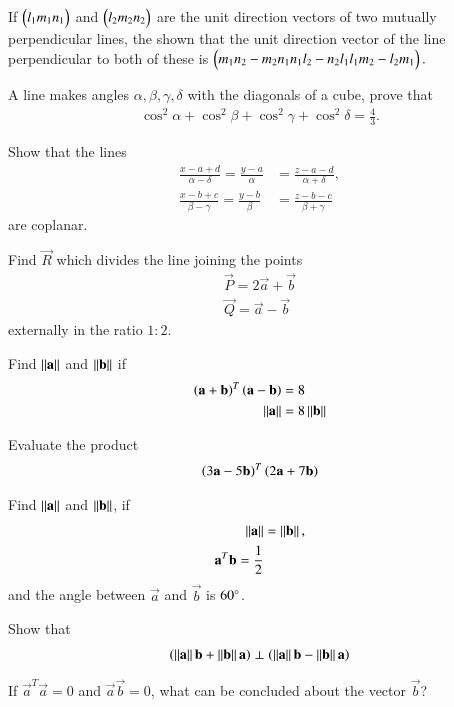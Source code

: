 \item If 
$
\begin{pmatrix}l_1m_1n_1\end{pmatrix}
$
and
$
\begin{pmatrix}l_2m_2n_2\end{pmatrix}
$
are the unit direction vectors of two mutually perpendicular lines, the shown that the unit direction vector of the line perpendicular to both of these is
$
\begin{pmatrix}m_1n_2-m_2n_1n_1l_2-n_2l_1l_1m_2-l_2m_1\end{pmatrix}.
$
\item A line makes angles $\alpha, \beta, \gamma, \delta$ with the diagonals of a cube, prove that \begin{align}
\cos^2\alpha + \cos^2\beta + \cos^2\gamma +\cos^2\delta = \frac{4}{3}.
\end{align}
\item Show that the lines 
\begin{align}
\frac{x-a+d}{\alpha-\delta} = \frac{y-a}{\alpha} &= \frac{z-a-d}{\alpha+\delta}, 
\\
\frac{x-b+c}{\beta-\gamma} = \frac{y-b}{\beta} &= \frac{z-b-c}{\beta+\gamma} 
\end{align}
%
are coplanar.
\item Find $\vec{R}$ which divides the line joining the points 
\begin{align}
\vec{P} = 2\vec{a}+\vec{b}
\\
\vec{Q} = \vec{a}-\vec{b}
\end{align}
externally in the ratio $1:2$.
\item Find $\left\lVert\mathbf{a}\right\rVert$ and $\left\lVert\mathbf{b}\right\rVert$ if 
\begin{align}
\left(\mathbf{a}+\mathbf{b}\right)^T\left(\mathbf{a}-\mathbf{b}\right) &= 8
\\
\left\lVert\mathbf{a}\right\rVert&=8\left\lVert\mathbf{b}\right\rVert
\end{align}
\item Evaluate the product 
\begin{align}
\left(3\mathbf{a}-5\mathbf{b}\right)^T\left(2\mathbf{a}+7\mathbf{b}\right) 
\end{align}
\item Find $\left\lVert\mathbf{a}\right\rVert$ and $\left\lVert\mathbf{b}\right\rVert$, if
\begin{align}
\left\lVert\mathbf{a}\right\rVert &= \left\lVert\mathbf{b}\right\rVert,
\\
\mathbf{a}^T\mathbf{b} = \frac{1}{2} 
\end{align}
and the angle between $\vec{a}$ and $\vec{b}$ is $60\degree$.
\item Show that 
\begin{align}
\left(\left\lVert\mathbf{a}\right\rVert\mathbf{b}+\left\lVert\mathbf{b}\right\rVert\mathbf{a}\right)\perp \left(\left\lVert\mathbf{a}\right\rVert\mathbf{b}-\left\lVert\mathbf{b}\right\rVert\mathbf{a}\right)\\
\end{align}
\item If $\vec{a}^T\vec{a}=0$ and  $\vec{a}\vec{b}=0$, what can be concluded about the vector $\vec{b}$?
